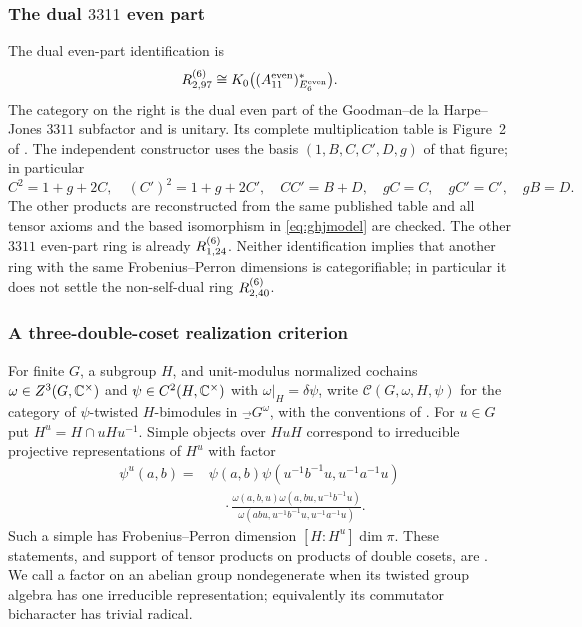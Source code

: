 \subsubsection{The dual $3311$ even part}
The dual even-part identification is
\begin{equation}\label{eq:ghjmodel}
 R^{(6)}_{2,97}\cong K_0\bigl((A_{11}^{\mathrm{even}})^*_{E_6^{\mathrm{even}}}\bigr).
\end{equation}
The category on the right is the dual even part of the
Goodman--de la Harpe--Jones $3311$ subfactor and is unitary.
Its complete multiplication table is Figure~2 of
\cite[Section~5.1]{IJMS}. The independent constructor uses the basis
$(1,B,C,C',D,g)$ of that figure; in particular
\[
 C^2=1+g+2C,\quad (C')^2=1+g+2C',\quad CC'=B+D,
 \quad gC=C,\quad gC'=C',\quad gB=D.
\]
The other products are reconstructed from the same published table and
all tensor axioms and the based isomorphism in \eqref{eq:ghjmodel} are
checked. The other $3311$ even-part ring is already $R^{(6)}_{1,24}$.
Neither identification implies that another ring with the same
Frobenius--Perron dimensions is categorifiable; in particular it does not
settle the non-self-dual ring $R^{(6)}_{2,40}$.

\subsubsection{A three-double-coset realization criterion}
For finite $G$, a subgroup $H$, and unit-modulus normalized cochains
$\omega\in Z^3(G,\mathbb C^\times)$ and $\psi\in C^2(H,\mathbb C^\times)$ with
$\omega|_H=\delta\psi$, write $\mathcal C(G,\omega,H,\psi)$ for the
category of $\psi$-twisted $H$-bimodules in $\Vec_G^\omega$, with the
conventions of \cite{GNgt}. For $u\in G$ put $H^u=H\cap uHu^{-1}$.
Simple objects over $HuH$ correspond to irreducible projective
representations of $H^u$ with factor
\begin{align}\label{eq:stabilizer-factor}
 \psi^u(a,b)={}&\psi(a,b)\psi(u^{-1}b^{-1}u,u^{-1}a^{-1}u)\nonumber\\
 &\quad\cdot\frac{\omega(a,b,u)\omega(a,bu,u^{-1}b^{-1}u)}
 {\omega(abu,u^{-1}b^{-1}u,u^{-1}a^{-1}u)}.
\end{align}
Such a simple has Frobenius--Perron dimension
$[H:H^u]\dim\pi$. These statements, and support of tensor products on
products of double cosets, are \cite[Theorems~4.1 and~5.1]{GNgt}.
We call a factor on an abelian group nondegenerate when its twisted group
algebra has one irreducible representation; equivalently its commutator
bicharacter has trivial radical.

